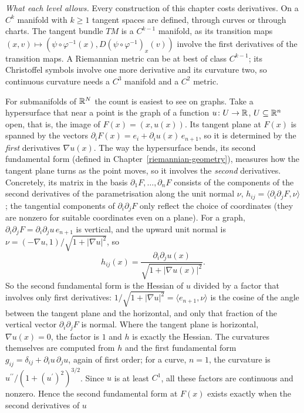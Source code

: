 \begin{remark}\label{smooth-manifolds:remark-regularity-losses}
\emph{What each level allows.} Every construction of this chapter costs derivatives. On a $C^k$ manifold with $k \geq 1$ tangent spaces are defined, through curves or through charts. The tangent bundle $TM$ is a
$C^{k-1}$ manifold, as its transition maps $(x, v) \mapsto (\psi \circ \varphi^{-1}(x), D(\psi \circ \varphi^{-1})_x(v))$ involve the first derivatives of the transition maps. A Riemannian metric can be at best of
class $C^{k-1}$; its Christoffel symbols involve one more derivative and its curvature two, so continuous curvature needs a $C^3$ manifold and a $C^2$ metric.

For submanifolds of $\mathbb{R}^N$ the count is easiest to see on graphs. Take a hypersurface that near a point is the graph of a function $u \colon U \to \mathbb{R}$, $U \subseteq \mathbb{R}^n$ open, that is, the image of
$F(x) = (x, u(x))$. Its tangent plane at $F(x)$ is spanned by the vectors $\partial_iF(x) = e_i + \partial_iu(x)\,e_{n+1}$, so it is determined by the \emph{first} derivatives $\nabla u(x)$. The way the hypersurface
bends, its second fundamental form (defined in Chapter~\ref{riemannian-geometry}), measures how the tangent plane turns as the point moves, so it involves the \emph{second} derivatives. Concretely, its matrix in the
basis $\partial_1F, \ldots, \partial_nF$ consists of the components of the second derivatives of the parametrisation along the unit normal $\nu$, $h_{ij} = \langle\partial_i\partial_jF, \nu\rangle$; the tangential
components of $\partial_i\partial_jF$ only reflect the choice of coordinates (they are nonzero for suitable coordinates even on a plane). For a graph, $\partial_i\partial_jF = \partial_i\partial_ju\,e_{n+1}$ is vertical, and
the upward unit normal is $\nu = (-\nabla u, 1)/\sqrt{1 + |\nabla u|^2}$, so
\[
h_{ij}(x) = \frac{\partial_i\partial_ju(x)}{\sqrt{1 + |\nabla u(x)|^2}} .
\]
So the second fundamental form is the Hessian of $u$ divided by a factor that involves only first derivatives: $1/\sqrt{1 + |\nabla u|^2} = \langle e_{n+1}, \nu\rangle$ is the cosine of the angle between the
tangent plane and the horizontal, and only that fraction of the vertical vector $\partial_i\partial_jF$ is normal. Where the tangent plane is horizontal, $\nabla u(x) = 0$, the factor is $1$ and $h$ is exactly the
Hessian. The curvatures themselves are computed from $h$ and the first fundamental form $g_{ij} = \delta_{ij} + \partial_iu\,\partial_ju$, again of first order; for a curve, $n = 1$, the curvature is
$u^{\prime\prime}/(1 + (u^{\prime})^2)^{3/2}$. Since $u$ is at least $C^1$, all these factors are continuous and nonzero. Hence the second fundamental form at $F(x)$ exists exactly when the second derivatives of $u$

\end{remark}
